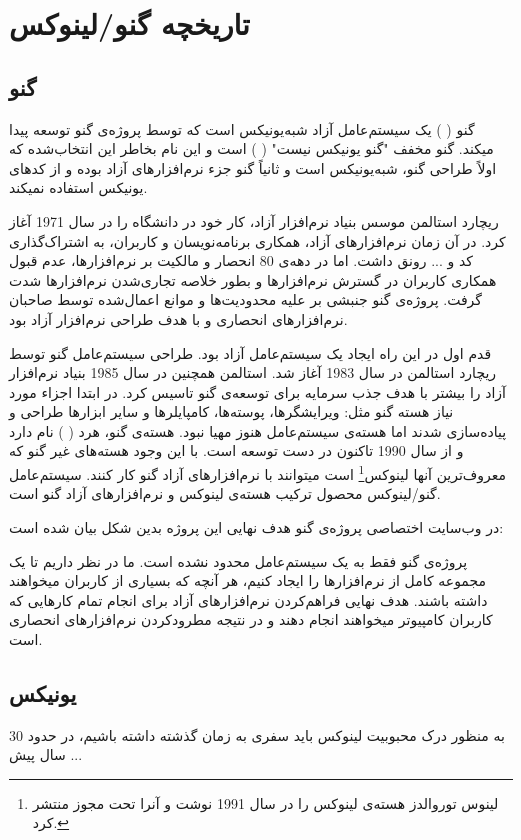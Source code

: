 \section{تاریخچه گنو/لینوکس}
\subsection*{گنو}
گنو (
) یک سیستم‌عامل آزاد شبه‌یونیکس است که توسط پروژه‌ی گنو توسعه پیدا میکند. گنو مخفف "گنو یونیکس نیست" (
) است و این نام بخاطر این انتخاب‌شده که اولاً طراحی گنو، شبه‌یونیکس است و ثانیاً گنو جزء نرم‌افزارهای آزاد بوده و از کدهای یونیکس استفاده نمیکند. 

ریچارد استالمن موسس بنیاد نرم‌افزار آزاد، کار خود در دانشگاه 
 را در سال 1971 آغاز کرد. در آن زمان نرم‌افزارهای آزاد، همکاری برنامه‌نویسان و کاربران، به اشتراک‌گذاری کد و ... رونق داشت. اما در دهه‌ی 80 انحصار و مالکیت بر نرم‌افزارها، عدم قبول همکاری کاربران در گسترش نرم‌افزارها و بطور خلاصه تجاری‌شدن نرم‌افزارها شدت گرفت. پروژه‌ی گنو جنبشی بر علیه محدودیت‌ها و موانع اعمال‌شده توسط صاحبان نرم‌افزارهای انحصاری و با هدف طراحی نرم‌افزار آزاد بود.
 
 قدم اول در این راه ایجاد یک سیستم‌عامل آزاد بود. طراحی سیستم‌عامل گنو توسط ریچارد استالمن در سال 1983 آغاز شد. استالمن همچنین در سال 1985 بنیاد نرم‌افزار آزاد را بیشتر با هدف جذب سرمایه برای توسعه‌ی گنو تاسیس کرد. در ابتدا اجزاء مورد نیاز هسته‌ گنو مثل: ویرایشگرها، پوسته‌ها، کامپایلرها و سایر ابزارها طراحی و پیاده‌سازی شدند اما هسته‌ی سیستم‌عامل هنوز مهیا نبود. هسته‌ی گنو، هرد (
) نام دارد و از سال 1990 تاکنون در دست توسعه است. با این وجود هسته‌های غیر گنو که معروف‌ترین آنها لینوکس\footnote{لینوس توروالدز هسته‌ی لینوکس را در سال 1991 نوشت و آنرا تحت مجوز 
	منتشر کرد.} است  میتوانند با نرم‌افزارهای آزاد گنو کار کنند. سیستم‌عامل گنو/لینوکس محصول ترکیب هسته‌ی لینوکس و نرم‌افزارهای آزاد گنو است. 

در وب‌سایت اختصاصی پروژه‌ی گنو هدف نهایی این پروژه بدین شکل بیان شده است:
\begin{mybox}
 پروژه‌ی گنو فقط به یک سیستم‌عامل محدود نشده است. ما در نظر داریم تا یک مجموعه‌ کامل از نرم‌افزارها را ایجاد کنیم، هر آنچه که بسیاری از کاربران میخواهند داشته باشند. هدف نهایی فراهم‌کردن نرم‌افزارهای آزاد برای انجام تمام کارهایی که کاربران کامپیوتر میخواهند انجام دهند و در نتیجه مطرودکردن نرم‌افزارهای انحصاری است.
\end{mybox}
\subsection*{یونیکس}
به منظور درک محبوبیت لینوکس باید سفری به زمان گذشته داشته باشیم، در حدود 30 سال پیش ...

